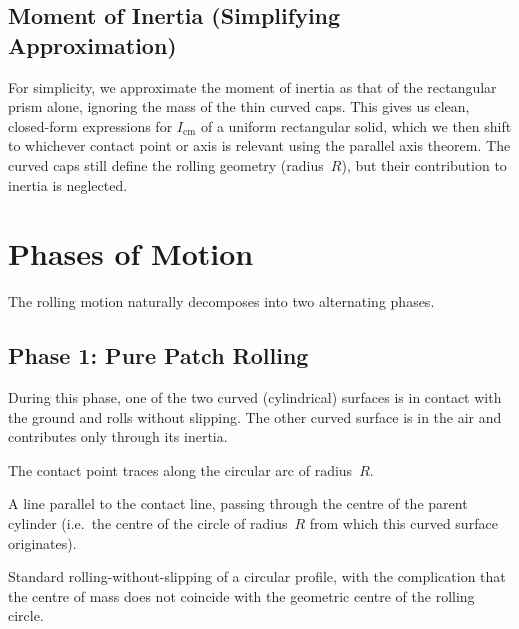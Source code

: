 \documentclass[11pt,a4paper]{article}
\newcommand{\cm}{\mathrm{cm}}
\begin{document}
\subsection{Moment of Inertia (Simplifying Approximation)}

For simplicity, we approximate the moment of inertia as that of the rectangular prism
alone, ignoring the mass of the thin curved caps.  This gives us clean, closed-form
expressions for $I_{\cm}$ of a uniform rectangular solid, which we then shift to
whichever contact point or axis is relevant using the parallel axis theorem.  The curved
caps still define the rolling geometry (radius~$R$), but their contribution to inertia is
neglected.

\section{Phases of Motion}

The rolling motion naturally decomposes into two alternating phases.

\subsection{Phase 1: Pure Patch Rolling}

During this phase, one of the two curved (cylindrical) surfaces is in contact with the
ground and rolls without slipping.  The other curved surface is in the air and contributes
only through its inertia.

\begin{description}[style=nextline, leftmargin=1.5cm]
  \item[Contact geometry]
    The contact point traces along the circular arc of radius~$R$.
  \item[Instantaneous axis of rotation]
    A line parallel to the contact line, passing through the centre of the parent cylinder
    (i.e.\ the centre of the circle of radius~$R$ from which this curved surface
    originates).
  \item[Dynamics]
    Standard rolling-without-slipping of a circular profile, with the complication that the
    centre of mass does not coincide with the geometric centre of the rolling circle.
\end{description}
\end{document}
